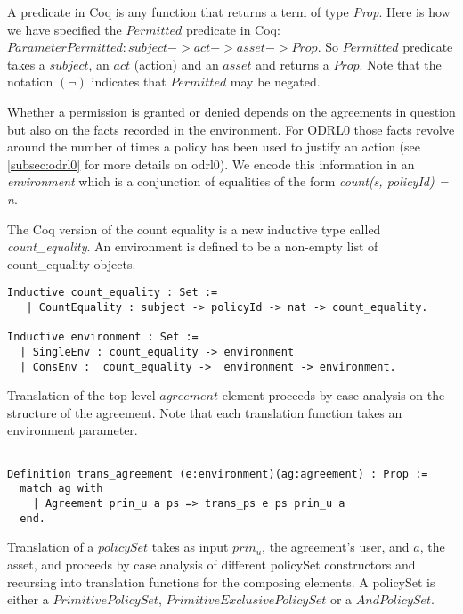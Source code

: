 
A predicate in Coq is any function that returns a term of type \emph{Prop}. Here is how we have specified the $Permitted$ predicate in Coq: $Parameter Permitted : subject -> act -> asset -> Prop.$ So $Permitted$ predicate takes a $subject$, an $act$ (action) and an $asset$ and returns a $Prop$. Note that the notation $(\lnot)$ indicates that $Permitted$ may be negated.


Whether a permission is granted or denied depends on the agreements in question but also on the facts recorded in the environment. For ODRL0 those facts revolve around the number of times a policy has been used to justify an action (see \ref{subsec:odrl0} for more details on odrl0). We encode this information in an \emph{environment} which is a conjunction of equalities of the form \emph{count(s, policyId) = n}. 

The Coq version of the count equality is a new inductive type called \emph{count_equality}. An environment is defined to be a non-empty list of count_equality objects.

\begin{lstlisting}
Inductive count_equality : Set := 
   | CountEquality : subject -> policyId -> nat -> count_equality.

Inductive environment : Set := 
  | SingleEnv : count_equality -> environment
  | ConsEnv :  count_equality ->  environment -> environment.

\end{lstlisting}


Translation of the top level $agreement$ element proceeds by case analysis on the structure of the agreement. Note that each translation function takes an environment parameter.


\begin{lstlisting}

Definition trans_agreement (e:environment)(ag:agreement) : Prop :=
  match ag with 
    | Agreement prin_u a ps => trans_ps e ps prin_u a
  end.

\end{lstlisting}

Translation of a $policySet$ takes as input $prin_{u}$, the agreement's user, and $a$, the asset, and proceeds by case analysis of different policySet constructors and recursing into translation functions for the composing elements. A policySet is either a $PrimitivePolicySet$, $PrimitiveExclusivePolicySet$ or a $AndPolicySet$. 
